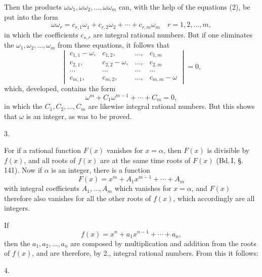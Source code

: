 
Then the products $\omega \omega_1, \omega \omega_2, \ldots, \omega \omega_m$ can, with the help of the equations (2), be put into the form
\[
\omega \omega_r = c_{r,1} \omega_1 + c_{r,2} \omega_2 + \cdots + c_{r,m} \omega_m \quad r = 1, 2, \ldots, m,
\]
in which the coefficients $c_{s,r}$ are integral rational numbers. But if one eliminates the $\omega_1, \omega_2, \ldots, \omega_m$ from these equations, it follows that
\[
\begin{vmatrix}
c_{1,1} - \omega, & c_{1,2}, & \ldots, & c_{1,m} \\
c_{2,1}, & c_{2,2} - \omega, & \ldots, & c_{2,m} \\
\cdots & \cdots & \cdots & \cdots \\
c_{m,1}, & c_{m,2}, & \ldots, & c_{m,m} - \omega
\end{vmatrix}
= 0,
\]
which, developed, contains the form
\[
\omega^m + C_1 \omega^{m-1} + \cdots + C_m = 0,
\]
in which the $C_1, C_2, \ldots, C_m$ are likewise integral rational numbers. But this shows that $\omega$ is an integer, as was to be proved.

3. 

For if a rational function $F(x)$ vanishes for $x = \alpha$, then $F(x)$ is divisible by $f(x)$, and all roots of $f(x)$ are at the same time roots of $F(x)$ (Bd.\,I, \S.\,141). Now if $\alpha$ is an integer, there is a function
\[
F(x) = x^m + A_1 x^{m-1} + \cdots + A_m
\]
with integral coefficients $A_1, \ldots, A_m$ which vanishes for $x = \alpha$, and $F(x)$ therefore also vanishes for all the other roots of $f(x)$, which accordingly are all integers.

If
\[
f(x) = x^n + a_1 x^{n-1} + \cdots + a_n,
\]
then the $a_1, a_2, \ldots, a_n$ are composed by multiplication and addition from the roots of $f(x)$, and are therefore, by 2., integral rational numbers. From this it follows:

4. 
